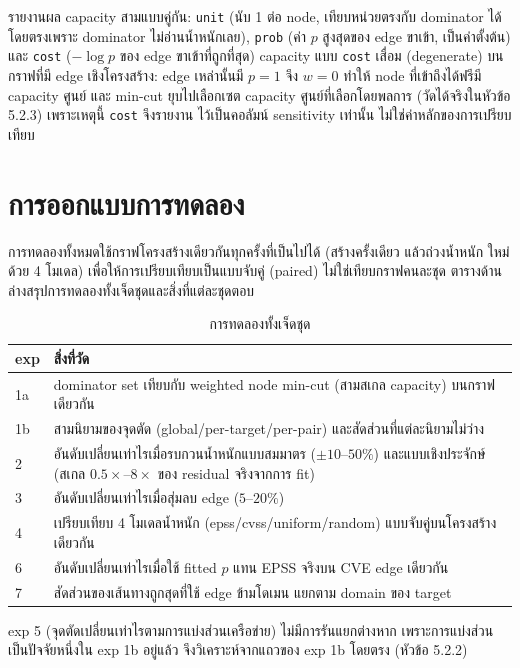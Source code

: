 รายงานผล capacity สามแบบคู่กัน: \texttt{unit} (นับ 1 ต่อ node, เทียบหน่วยตรงกับ
dominator ได้โดยตรงเพราะ dominator ไม่อ่านน้ำหนักเลย), \texttt{prob} (ค่า $p$ สูงสุดของ
edge ขาเข้า, เป็นค่าตั้งต้น) และ \texttt{cost} ($-\log p$ ของ edge ขาเข้าที่ถูกที่สุด) capacity
แบบ \texttt{cost} เสื่อม (degenerate) บนกราฟที่มี edge เชิงโครงสร้าง: edge เหล่านั้นมี $p=1$
จึง $w=0$ ทำให้ node ที่เข้าถึงได้ฟรีมี capacity ศูนย์ และ min-cut ยุบไปเลือกเซต
capacity ศูนย์ที่เลือกโดยพลการ (วัดได้จริงในหัวข้อ 5.2.3) เพราะเหตุนี้ \texttt{cost} จึงรายงาน
ไว้เป็นคอลัมน์ sensitivity เท่านั้น ไม่ใช่ค่าหลักของการเปรียบเทียบ

\section{การออกแบบการทดลอง}

การทดลองทั้งหมดใช้กราฟโครงสร้างเดียวกันทุกครั้งที่เป็นไปได้ (สร้างครั้งเดียว แล้วถ่วงน้ำหนัก
ใหม่ด้วย 4 โมเดล) เพื่อให้การเปรียบเทียบเป็นแบบจับคู่ (paired) ไม่ใช่เทียบกราฟคนละชุด
ตารางด้านล่างสรุปการทดลองทั้งเจ็ดชุดและสิ่งที่แต่ละชุดตอบ

\begin{table}[H]
\centering
\caption{การทดลองทั้งเจ็ดชุด}\label{tab:exps}
\small
\begin{tabular}{lp{10cm}}
\toprule
exp & สิ่งที่วัด \\
\midrule
1a & dominator set เทียบกับ weighted node min-cut (สามสเกล capacity) บนกราฟเดียวกัน \\
1b & สามนิยามของจุดตัด (global/per-target/per-pair) และสัดส่วนที่แต่ละนิยามไม่ว่าง \\
2 & อันดับเปลี่ยนเท่าไรเมื่อรบกวนน้ำหนักแบบสมมาตร ($\pm10$--$50\%$) และแบบเชิงประจักษ์
(สเกล $0.5\times$--$8\times$ ของ residual จริงจากการ fit) \\
3 & อันดับเปลี่ยนเท่าไรเมื่อสุ่มลบ edge ($5$--$20\%$) \\
4 & เปรียบเทียบ 4 โมเดลน้ำหนัก (epss/cvss/uniform/random) แบบจับคู่บนโครงสร้างเดียวกัน \\
6 & อันดับเปลี่ยนเท่าไรเมื่อใช้ fitted $p$ แทน EPSS จริงบน CVE edge เดียวกัน \\
7 & สัดส่วนของเส้นทางถูกสุดที่ใช้ edge ข้ามโดเมน แยกตาม domain ของ target \\
\bottomrule
\end{tabular}
\end{table}

exp 5 (จุดตัดเปลี่ยนเท่าไรตามการแบ่งส่วนเครือข่าย) ไม่มีการรันแยกต่างหาก เพราะการแบ่งส่วน
เป็นปัจจัยหนึ่งใน exp 1b อยู่แล้ว จึงวิเคราะห์จากแถวของ exp 1b โดยตรง (หัวข้อ 5.2.2)


